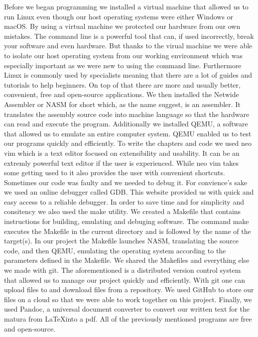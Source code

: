 Before we began programming we installed a virtual machine that 
allowed us to run Linux even though our host operating systems were either Windows or macOS. By using a virtual machine we protected our hardware from our own mistakes. The 
command line is a powerful tool that can, if used incorrectly, break your software and even hardware. But thanks to the virual machine we were able to isolate our host 
operating system from our working environment which was especially important as we were new to using the command line. Furthermore Linux is commonly used by specialists 
meaning that there are a lot of guides and tutorials to help beginners. On top of that there are more and usually better, convenient, free and open-source applications. We 
then installed the Netwide Assembler or NASM for short which, as the name suggest, is an assembler. It translates the assembly source code into machine language
so that the hardware can read and execute the program. Additionally we installed QEMU, a software that allowed us to emulate an entire computer system. QEMU enabled us to 
test our programs quickly and efficiently. To write the chapters and code we used neo vim which is a text editor focused on extensibility and usability. 
It can be an extremly powerful text editor if the user is experienced. While neo vim takes some getting used to it also provides the user with convenient shortcuts. 
Sometimes our code was faulty and we needed to debug it. For convience's sake we used an online debugger called GDB. This website provided us with quick and easy access to 
a reliable debugger. In order to save time and for simplicity and consitency we also used the make utility. We created a Makefile that contains instructions for building, 
emulating and debuging software. The command make executes the Makefile in the current directory and is followed by the name of the target(s). In our project the Makefile 
launches NASM, translating the source code, and then QEMU, emulating the operating system according to the parameters defined in the Makefile. We shared the Makefiles and 
everything else we made with git. The aforementioned is a distributed version control system that allowed us to manage our project quickly and efficiently. With git one can 
upload files to and download files from a repository. We used GitHub to store our files on a cloud so that we were able to work together on this project. Finally, we used Pandoc,
a universal document converter to convert our written text for the matura from \LaTeX  into a pdf. All of the previously mentioned programs are free and open-source.

